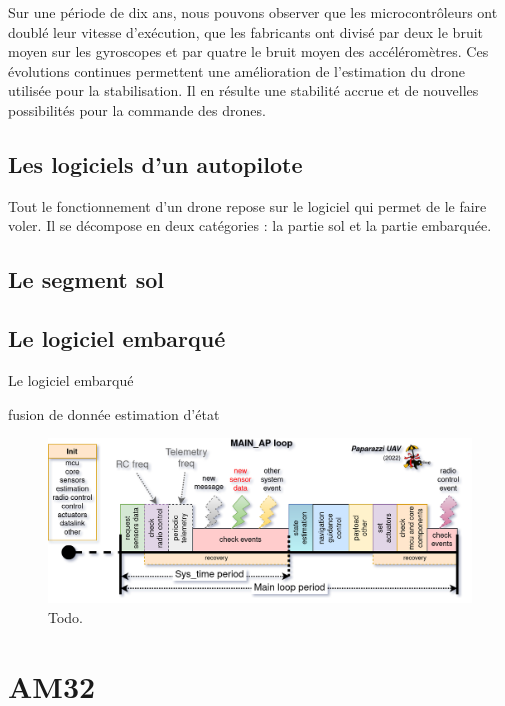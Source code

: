 Sur une période de dix ans, nous pouvons observer que les microcontrôleurs ont doublé leur vitesse d'exécution, que les fabricants ont divisé par deux le bruit moyen sur les gyroscopes et par quatre le bruit moyen des accéléromètres.
Ces évolutions continues permettent une amélioration de l'estimation du drone utilisée pour la stabilisation. Il en résulte une stabilité accrue et de nouvelles possibilités pour la commande des drones.

 \subsection{Les logiciels d'un autopilote}
 \label{sec:logiciel}
 Tout le fonctionnement d'un drone repose sur le logiciel qui permet de le faire voler. Il se décompose en deux catégories : la partie sol et la partie embarquée.

 \subsection{Le segment sol}

 \subsection{Le logiciel embarqué}
 Le logiciel embarqué 

 fusion de donnée 
 estimation d'état 

 \begin{figure}[ht!]
    \centerline{
    \includegraphics[trim=0cm 0cm 0cm 0cm,clip,width=1\columnwidth]{figures/PPRZ_Main_ap_loop.png}}
    \caption{Todo.}
    \label{fig:schedulingpaparazzi}
\end{figure}


\section{AM32}